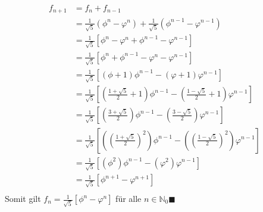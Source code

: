 \documentclass{article}
\begin{document}
\begin{align*}
    f_{n+1}&=f_n+f_{n-1}\\
    &= \frac{1}{\sqrt{5}}(\phi^n-\varphi^n)+
    \frac{1}{\sqrt{5}}(\phi^{n-1}-\varphi^{n-1})\\
    &= \frac{1}{\sqrt{5}}[\phi^n-\varphi^n+
    \phi^{n-1}-\varphi^{n-1}]\\
    &= \frac{1}{\sqrt{5}}[\phi^n+\phi^{n-1}-
    \varphi^n-\varphi^{n-1}]\\
    &= \frac{1}{\sqrt{5}}
    [(\phi+1)\phi^{n-1}-(\varphi+1)\varphi^{n-1}]\\
    &= \frac{1}{\sqrt{5}}
    [(\frac{1+\sqrt{5}}{2}+1)\phi^{n-1}-(\frac{1-\sqrt{5}}{2}+1)\varphi^{n-1}]\\
    &= \frac{1}{\sqrt{5}}
    [(\frac{3+\sqrt{5}}{2})\phi^{n-1}-(\frac{3-\sqrt{5}}{2})\varphi^{n-1}]\\
    &= \frac{1}{\sqrt{5}}
    [((\frac{1+\sqrt{5}}{2})^2)\phi^{n-1}-((\frac{1-\sqrt{5}}{2})^2)\varphi^{n-1}]\\
    &= \frac{1}{\sqrt{5}}
    [(\phi^2)\phi^{n-1}-(\varphi^2)\varphi^{n-1}]\\
    &= \frac{1}{\sqrt{5}}
    [\phi^{n+1}-\varphi^{n+1}]\\
\end{align*}
Somit gilt $f_n = \frac{1}{\sqrt{5}}[\phi^n-\varphi^n]$ für alle $n\in\mathbb N_0\blacksquare$
\end{document}
